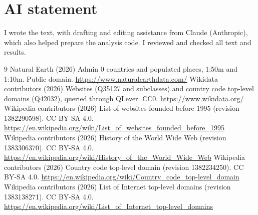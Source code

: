 \documentclass[11pt,a4paper]{article}
\begin{document}
\section*{AI statement}
I wrote the text, with drafting and editing assistance from Claude (Anthropic), which also helped prepare the analysis code. I reviewed and checked all text and results.

\begin{thebibliography}{9}
 Natural Earth (2026) Admin 0 countries and populated places, 1:50m and 1:10m. Public domain. \url{https://www.naturalearthdata.com/}
 Wikidata contributors (2026) Websites (Q35127 and subclasses) and country code top-level domains (Q42032), queried through QLever. CC0. \url{https://www.wikidata.org/}
 Wikipedia contributors (2026) List of websites founded before 1995 (revision 1382290598). CC BY-SA 4.0. \url{https://en.wikipedia.org/wiki/List_of_websites_founded_before_1995}
 Wikipedia contributors (2026) History of the World Wide Web (revision 1383306370). CC BY-SA 4.0. \url{https://en.wikipedia.org/wiki/History_of_the_World_Wide_Web}
 Wikipedia contributors (2026) Country code top-level domain (revision 1382234250). CC BY-SA 4.0. \url{https://en.wikipedia.org/wiki/Country_code_top-level_domain}
 Wikipedia contributors (2026) List of Internet top-level domains (revision 1383138271). CC BY-SA 4.0. \url{https://en.wikipedia.org/wiki/List_of_Internet_top-level_domains}
\end{thebibliography}

\clearpage
\appendix
\end{document}
